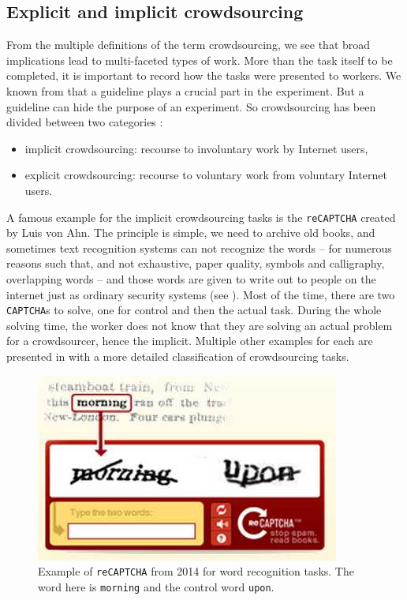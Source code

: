 \subsection{Explicit and implicit crowdsourcing}
\label{sub:explicit-and-implicit}

From the multiple definitions of the term crowdsourcing, we see that broad implications lead to multi-faceted types of work.
More than the task itself to be completed, it is important to record how the tasks were presented to workers.
We known from  that a guideline plays a crucial part in the experiment. 
But a guideline can hide the purpose of an experiment. So crowdsourcing has been divided between two categories \citep{andro2017digital}:
\begin{itemize}
    \item implicit crowdsourcing: recourse to involuntary work by Internet users,
    \item explicit crowdsourcing: recourse to voluntary work from voluntary Internet users.
\end{itemize}

A famous example for the implicit crowdsourcing tasks is the \texttt{reCAPTCHA} created by Luis von Ahn.
The principle is simple, we need to archive old books, and sometimes text recognition systems can not recognize the words -- for numerous reasons such that, and not exhaustive, paper quality, symbols and calligraphy, overlapping words -- and those words are given to write out to people on the internet just as ordinary security systems (see ).
Most of the time, there are two \texttt{CAPTCHA}s to solve, one for control and then the actual task.
During the whole solving time, the worker does not know that they are solving an actual problem for a crowdsourcer, hence the implicit.
Multiple other examples for each are presented in  with a more detailed classification of crowdsourcing tasks.

\begin{figure}[ht]
    \centering
    \includegraphics[width=.5\textwidth]{chapters/images/recaptcha.jpg}
    \caption{Example of \texttt{reCAPTCHA} from 2014 for word recognition tasks. The word here is \texttt{morning} and the control word \texttt{upon}.}
    \label{fig:recaptcha}
\end{figure}


